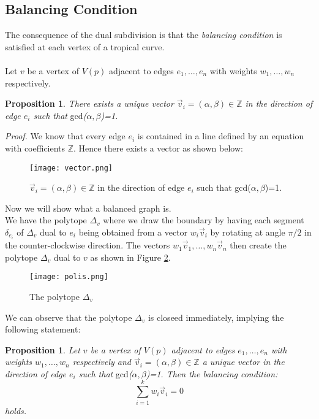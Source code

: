 \documentclass[]{article}
\theoremstyle{definition}
\numberwithin{equation}{section}
\newtheorem{prop}[thm]{Proposition}
\renewcommand{\.}{\,.}
\begin{document}
\subsection{Balancing Condition}
\hspace{3mm} The consequence of the dual subdivision is that the \emph{balancing condition} is satisfied at each vertex of a tropical curve. \\ \\
\hspace*{3mm}Let $v$ be a vertex of $V(p)$ adjacent to edges $e_1,\ldots,e_n$ with weights $w_1,\ldots,w_n$ respectively.
 \begin{prop}\emph{There exists a unique vector $\vec{v}_i=(\alpha,\beta)\in \mathbb{Z}$ in the direction of edge $e_i$ such that }gcd\emph{($\alpha,\beta$)=1.} \end{prop}
\vspace{-5mm}
\hspace{3mm} \emph{Proof.} We know that every edge $e_i$ is contained in a line defined by an equation with coefficients $\mathbb{Z}$. Hence there exists a vector as shown below: \begin{figure}[H]
	\centering
	\texttt{[image: vector.png]}
	\caption{$\vec{v}_i=(\alpha,\beta)\in \mathbb{Z}$ in the direction of edge $e_i$ such that gcd($\alpha,\beta$)=1.}
	\label{fig:wowe} \end{figure} 
	 \hspace*{3mm} Now we will show what a balanced graph is. \\ We  have the polytope $\Delta_v$ where we draw the boundary by having each segment $\delta_{e_i}$ of $\Delta_v$ dual to $e_i$ being obtained from a vector $w_i\vec{v}_i$ by rotating at angle $\pi/2$ in the counter-clockwise direction. The vectors $w_1\vec{v}_1,\ldots,w_n\vec{v}_n$ then create the  polytope $\Delta_v$ dual to $v$ as shown in Figure \ref{fig:lulxd3}.
\begin{figure}[H]
	\centering
	\texttt{[image: polis.png]}
	\caption{The polytope $\Delta_v$}
	\label{fig:lulxd3} \end{figure}
We can observe that the polytope $\Delta_v$ is closeed immediately, implying the following statement:
\begin{prop}
	\emph{Let $v$ be a vertex of $V(p)$ adjacent to edges $e_1,\ldots,e_n$ with weights $w_1,\ldots,w_n$ respectively and $\vec{v}_i=(\alpha,\beta)\in \mathbb{Z}$ a unique vector in the direction of edge $e_i$ such that }gcd\emph{($\alpha,\beta$)=1. Then the balancing condition:}
	\begin{equation}
		 \sum_{i=1}^{k} w_i\vec{v}_i = 0 
	\end{equation}
\emph{holds.}
\end{prop}
\end{document}
